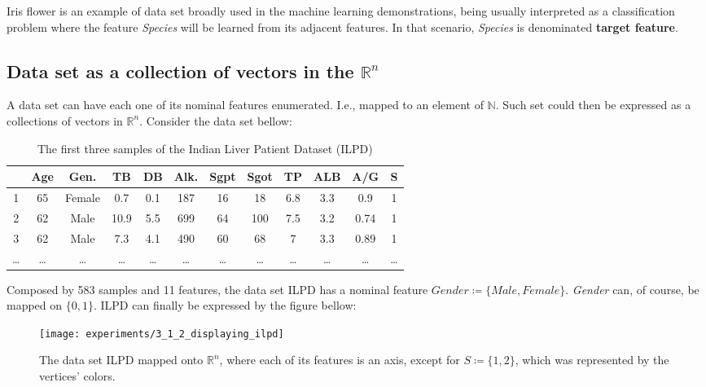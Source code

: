 Iris flower is an example of data set broadly used in the machine learning demonstrations, being usually interpreted as a classification problem where the feature {\em Species} will be learned from its adjacent features. In that scenario, {\em Species} is denominated \textbf{target feature}.

\subsection{Data set as a collection of vectors in the $\mathbb{R}^n$}

A data set can have each one of its nominal features enumerated. I.e., mapped to an element of $\mathbb{N}$. Such set could then be expressed as a collections of vectors in $\mathbb{R}^n$.
Consider the data set bellow:

\begin{table}[H]
	\begin{tabular}{ c | *{11}{|c}| }
		& \textbf{Age}
		& \textbf{Gen.}
		& \textbf{TB}
		& \textbf{DB}
		& \textbf{Alk.}
		& \textbf{Sgpt}
		& \textbf{Sgot}
		& \textbf{TP}
		& \textbf{ALB}
		& \textbf{A/G}
		& \textbf{S} \\
		 & 65 & Female & 0.7 & 0.1 & 187 & 16 & 18 & 6.8 & 3.3 & 0.9 & 1 \\
		2 & 62 & Male & 10.9 & 5.5 & 699 & 64 & 100 & 7.5 & 3.2 & 0.74 & 1 \\
		3 & 62 & Male & 7.3 & 4.1 & 490 & 60 & 68 & 7 & 3.3 & 0.89 & 1\\
		… & … & … & … & … & … & … & … & … & … & … & … \\
	\end{tabular}

	\caption{The first three samples of the Indian Liver Patient Dataset (ILPD)}
\end{table}

Composed by 583 samples and 11 features, the data set ILPD has a nominal feature $Gender \coloneqq \{Male, Female\}$. {\em Gender} can, of course, be mapped on $\{0, 1\}$. ILPD can finally be expressed by the figure bellow:

\begin{figure}[H]
	\centering
	\captionsetup{justification=centering}

	\texttt{[image: experiments/3\_1\_2\_displaying\_ilpd]}
	\caption{The data set ILPD mapped onto $\mathbb{R}^n$, where each of its features is an axis, except for $S \coloneqq \{1, 2\}$, which was represented by the vertices' colors.}
	\label{fig:disp_ilpd}
\end{figure}

